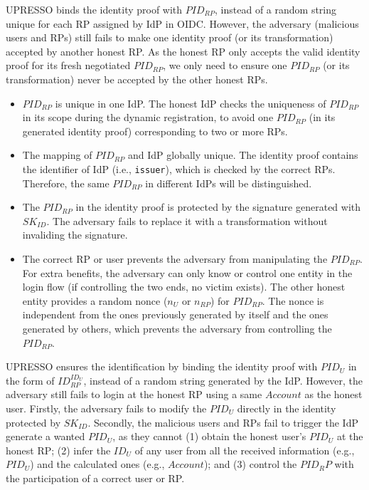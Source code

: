 UPRESSO binds the identity proof with $PID_{RP}$, instead of a random string unique for each RP assigned by IdP in OIDC. However, the adversary (malicious users and RPs) still fails to  make one identity proof (or its transformation) accepted by another honest RP. As the honest RP only accepts the valid identity proof for its fresh negotiated $PID_{RP}$, we only need to ensure one $PID_{RP}$ (or its transformation) never be accepted by the other honest RPs.
\begin{itemize}
\item $PID_{RP}$ is unique in one IdP. The honest IdP checks the uniqueness of $PID_{RP}$ in its scope during the dynamic registration, to avoid one $PID_{RP}$ (in its generated identity proof) corresponding to two or more RPs.
\item The mapping of $PID_{RP}$ and IdP globally unique. The identity proof contains the identifier of IdP (i.e., \verb+issuer+), which is checked by the correct RPs. Therefore, the same $PID_{RP}$ in different IdPs will be distinguished.
\item The $PID_{RP}$ in the identity proof is protected by the signature generated with $SK_{ID}$. The adversary fails to replace it with a transformation without invaliding the signature.
\item The correct RP or user prevents the adversary from manipulating the $PID_{RP}$. For extra benefits, the adversary can only know or control one entity in the login flow (if controlling the two ends, no victim exists). The other honest entity provides a random nonce ($n_U$ or $n_{RP}$) for $PID_{RP}$. The nonce is independent from the ones previously generated by itself  and the ones generated by others, which prevents the adversary from controlling the $PID_{RP}$.

\end{itemize}

UPRESSO ensures the identification by binding the identity proof with $PID_U$  in the form of $ID_{RP}^{ID_U}$, instead of a random string generated by the IdP. However, the adversary still fails to login at the honest RP using a same $Account$ as the honest user. Firstly, the adversary fails to  modify the $PID_U$ directly in the identity protected by $SK_{ID}$. Secondly, the malicious users and RPs fail to trigger the IdP generate a wanted $PID_U$, as they cannot (1) obtain the honest user's $PID_U$ at the honest RP; (2) infer the $ID_U$ of any user from all the received  information (e.g., $PID_U$) and the calculated ones (e.g., $Account$); and (3) control the $PID_RP$ with the participation of a correct user or RP.

